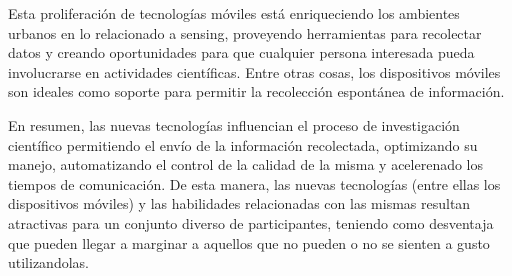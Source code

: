 	Esta proliferación de tecnologías móviles está enriqueciendo los ambientes urbanos en lo relacionado a sensing, proveyendo herramientas para recolectar datos y creando oportunidades para que cualquier persona interesada pueda involucrarse en actividades científicas. Entre otras cosas, los dispositivos móviles son ideales como soporte para permitir la recolección espontánea de información. \cite{kim2013sensr}
	
	En resumen, las nuevas tecnologías influencian el proceso de investigación científico permitiendo el envío de la información recolectada, optimizando su manejo, automatizando el control de la calidad de la misma y acelerenado los tiempos de comunicación. De esta manera, las nuevas tecnologías (entre ellas los dispositivos móviles) y las habilidades relacionadas con las mismas resultan atractivas para un conjunto diverso de participantes, teniendo como desventaja que pueden llegar a marginar a aquellos que no pueden o no se sienten a gusto utilizandolas. \cite{newman2012future}
